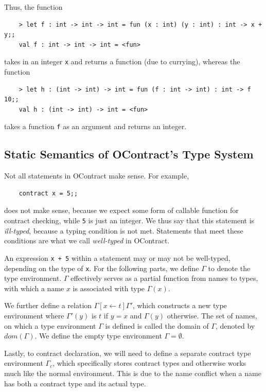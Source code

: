 \documentclass[a4paper]{article}
\begin{document}
Thus, the function

\begin{verbatim}
    > let f : int -> int -> int = fun (x : int) (y : int) : int -> x + y;;
    val f : int -> int -> int = <fun>
\end{verbatim}

takes in an integer \verb|x| and returns a function (due to currying), whereas the function

\begin{verbatim}
    > let h : (int -> int) -> int = fun (f : int -> int) : int -> f 10;;
    val h : (int -> int) -> int = <fun>
\end{verbatim}

takes a function \verb|f| as an argument and returns an integer.

\subsection{Static Semantics of OContract's Type System}

Not all statements in OContract make sense. For example,

\begin{verbatim}
    contract x = 5;;
\end{verbatim}

does not make sense, because we expect some form of callable function for contract checking, while \verb|5| is just an integer.
We thus say that this statement is \textit{ill-typed}, because a typing condition is not met.
Statements that meet these conditions are what we call \textit{well-typed} in OContract.

An expression \verb|x + 5| within a statement may or may not be well-typed, depending on the type of \verb|x|.
For the following parts, we define $\Gamma$ to denote the type environment.
$\Gamma$ effectively serves as a partial function from names to types, with which a name $x$ is associated with type $\Gamma(x)$.

We further define a relation $\Gamma[x\leftarrow t]\Gamma'$, which constructs a new type environment where $\Gamma'(y)$ is $t$ if $y=x$ and $\Gamma(y)$ otherwise.
The set of names, on which a type environment $\Gamma$ is defined is called the domain of $\Gamma$, denoted by $dom(\Gamma)$.
We define the empty type environment $\Gamma=\emptyset$.

Lastly, to contract declaration, we will need to define a separate contract type environment $\Gamma_c$, which specifically stores contract types and otherwise works much like the normal environment.
This is due to the name conflict when a name has both a contract type and its actual type.
\end{document}
